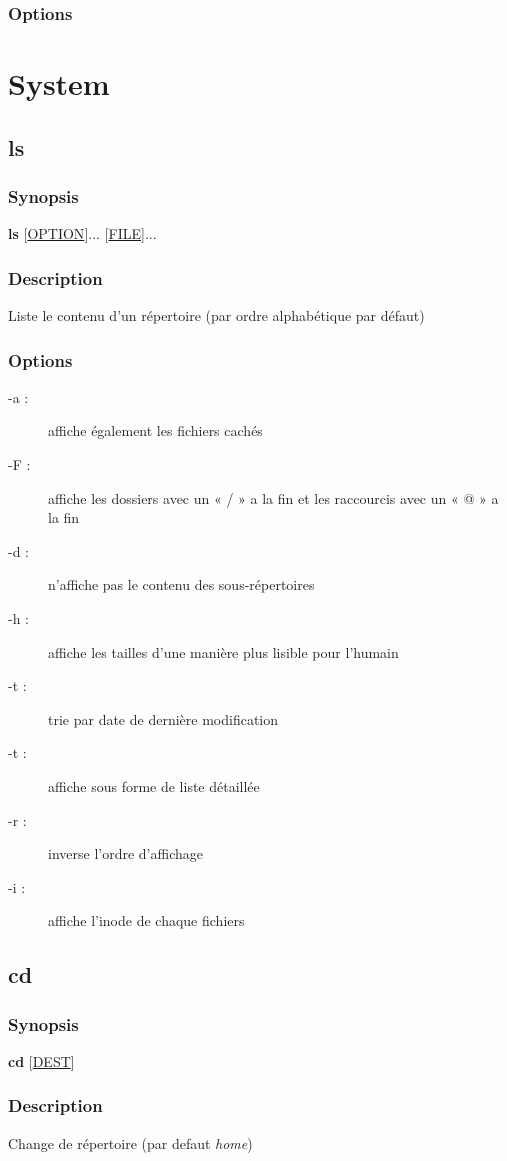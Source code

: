 \documentclass[a4paper, 10pt, onecolumn, openright, oneside]{book}
\begin{document}
			\subsection{Options}
	\chapter{System}
		\section{ls}
			\subsection{Synopsis}
				\textbf{ls} [\ul{OPTION}]... [\ul{FILE}]...
			\subsection{Description}
				Liste le contenu d'un répertoire (par ordre alphabétique par défaut)
			\subsection{Options}
				\begin{description}
				\item[-a :] affiche également les fichiers cachés
				\item[-F :] affiche les dossiers avec un « / » a la fin et les raccourcis avec un « @ » a la fin
				\item[-d :] n'affiche pas le contenu des sous-répertoires
				\item[-h :] affiche les tailles d’une manière plus lisible pour l’humain
				\item[-t :] trie par date de dernière modification
				\item[-t :] affiche sous forme de liste détaillée
				\item[-r :] inverse l'ordre d'affichage
				\item[-i :] affiche l’inode de chaque fichiers
				\end{description}
		\section{cd}
			\subsection{Synopsis}
				\textbf{cd} [\ul{DEST}]
			\subsection{Description}
				Change de répertoire (par defaut \emph{home})
\end{document}
